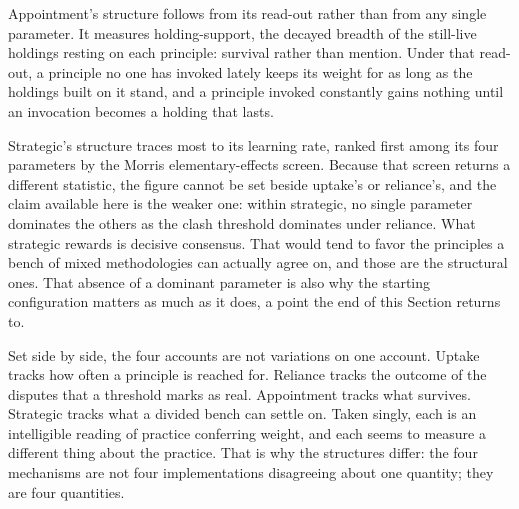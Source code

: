 Appointment's structure follows from its read-out rather than from any
single parameter. It measures holding-support, the decayed breadth of the
still-live holdings resting on each principle: survival rather than mention. Under that read-out, a principle no one has invoked lately keeps its weight
for as long as the holdings built on it stand, and a principle invoked
constantly gains nothing until an invocation becomes a holding that
lasts.

Strategic's structure traces most to its learning rate, ranked first among its
four parameters by the Morris elementary-effects screen. Because that
screen returns a different statistic, the figure cannot be set beside
uptake's or reliance's, and the claim available here is the weaker one: within
strategic, no single parameter dominates the others as the clash threshold
dominates under reliance. What strategic rewards is decisive consensus. That would tend to favor the
principles a bench of mixed methodologies can actually agree on, and
those are the structural ones. That absence of a dominant parameter
is also why the starting configuration matters as much as it
does, a point the end of this Section returns to.

Set side by side, the four accounts are not variations on one account.
Uptake tracks how often a principle is reached for. Reliance tracks the
outcome of the disputes that a threshold marks as real. Appointment
tracks what survives. Strategic tracks what a divided bench can settle
on. Taken singly, each is an intelligible reading of practice conferring
weight, and each seems to measure a different thing about the practice. That is why the
structures differ: the four mechanisms are not four implementations
disagreeing about one quantity; they are four quantities.


